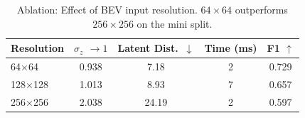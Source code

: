 \begin{table}[t]
\centering
\caption{Ablation: Effect of BEV input resolution. $64{\times}64$ outperforms $256{\times}256$ on the mini split.}
\label{tab:ablation_bev}
\begin{tabular}{lcccc}
\toprule
Resolution & $\sigma_z$ $\rightarrow 1$ & Latent Dist.\ $\downarrow$ & Time (ms) & F1 $\uparrow$ \\
\midrule
  64$\times$64 & 0.938 & 7.18 & 2 & 0.729 \\
  128$\times$128 & 1.013 & 8.93 & 7 & 0.657 \\
  256$\times$256 & 2.038 & 24.19 & 2 & 0.597 \\
\bottomrule
\end{tabular}
\end{table}
